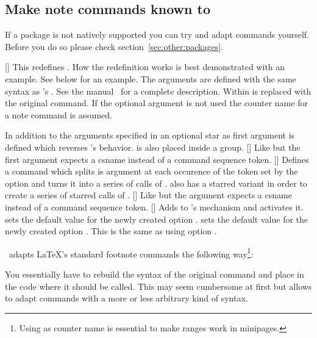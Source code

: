 \documentclass{fnpct-manual}
\begin{document}
\subsection{Make note commands known to \fnpct}\label{sec:adapt}
If a package is not natively supported you can try and adapt commands
yourself.  Before you do so please check section~\vref{sec:other:packages}.
\begin{commands}
  [] 
    This redefines .  How the redefinition works is best demonstrated
    with an example. See below for an example.  The arguments 
    are defined with the same syntax as 's
    .  See the  manual~\cite{pkg:xparse}
    for a complete description.  Within   is replaced
    with the original command.  If the optional argument is not used the
    counter name  for a note command  is assumed.

    In addition to the arguments specified in  an optional
    star as first argument is defined which reverses \fnpct's behavior.
     is also placed inside a group.
  []
    Like  but the first argument expects a csname instead of a
    command sequence token.
  []
    Defines a command  which splits is argument at each occurence
    of the token set by the option  and turns it into a
    series of calls of .   also has a starred variant in
    order to create a series of starred calls of .
  []
    Like  but the argument expects a csname instead of a
    command sequence token.
  []
    Adds  to \fnpct's mechanism and activates it. 
    sets the default value for the newly created option
    .  sets the default value for
    the newly created option .  This is the
    same as using option .
\end{commands}

\fnpct\ adapts \LaTeX's standard footnote commands the following
way\footnote{Using  as counter name is essential to make ranges
  work in minipages.}:
You essentially have to rebuild the syntax of the original command and place
 in the code where it should be called.  This may seem cumbersome
at first but allows to adapt commands with a more or less arbitrary kind of
syntax.
\end{document}
